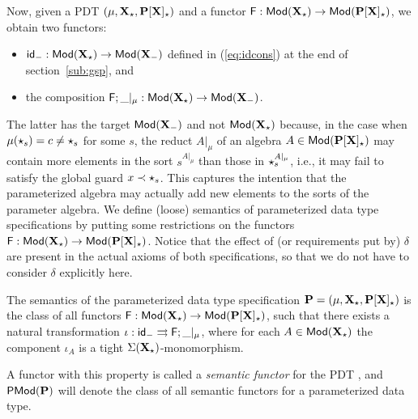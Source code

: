 Now, given a PDT $(\mu,{\bf X_\star},{\bf P[X]_\star})$
and a functor ${\sf {F}}:{\sf {Mod}}({\bf X_\star})\to {\sf {Mod}}({\bf P[X]_\star})$, we
obtain two functors: 
\begin{itemize}\MyLPar
\item 
${\sf {id}}_-:{\sf {Mod}}({\bf X_\star})\to {\sf {Mod}}({\bf X_-})$ defined in
 (\ref{eq:idcons}) at the end of section~\ref{sub:gsp}, and
\item  the composition
${\sf {F}};\_|_\mu:{\sf {Mod}}({\bf X_\star})\to {\sf {Mod}}({\bf X_-})$. 
\end{itemize}
The latter has the target ${\sf {Mod}}({\bf X_-})$ and not ${\sf {Mod}}({\bf X_\star})$
because, in the case when $\mu(\star_s)=c\not=\star_s$ for some $s$, the
reduct $A|_\mu$ of an algebra $A\in{\sf {Mod}}({\bf P[X]_\star})$ may contain more
elements in the sort $s^{A|_{\mu}}$ than those in $\star_s^{A|_{\mu}}$, i.e.,
it may fail to satisfy the global guard $x\prec \star_s$. This captures the
intention that the parameterized algebra may actually add new elements to the
sorts of the parameter algebra. We define (loose) semantics of parameterized
data type specifications by putting some restrictions on the functors
${\sf {F}}:{\sf {Mod}}({\bf X_\star})\to {\sf {Mod}}({\bf P[X]_\star})$. Notice that the
effect of (or requirements put by) $\delta$ are present in the actual axioms
of both specifications, so that we do not have to consider $\delta$ explicitly
here. 
%
\begin{definition}
\label{def:parametersemantic}
The semantics of the
parameterized data type specification ${\bf P} = (\mu,{\bf X_\star},{\bf P[X]_\star})$
is the class of all functors ${\sf {F}}:
{\sf {Mod}}({\bf X_\star}) \to {\sf {Mod}}({\bf P[X]_\star})$, such that there exists a
natural transformation $\iota: {\sf {id_-}} \mathrel{\rightrightarrows}
{\sf {F}};\_|_{\mu}$, where for each $A\in{\sf {Mod}}({\bf X_\star})$ the
component $\iota_A$ is a tight ${\Sigma}({\bf X_\star})$-monomorphism.
\end{definition}
A functor with this property is
called a {\em semantic functor} for the PDT ,
 and ${\sf {PMod}}({\bf P})$ will denote the class of all semantic functors for a parameterized
data type.

